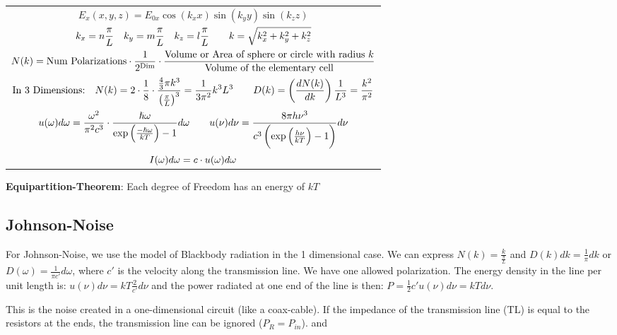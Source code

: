\documentclass[a4paper, 9pt]{extarticle}
\begin{document}
\begin{twocolumn}
\begin{tabular}{c}
	$E_x(x,y,z) = E_{0x} \cos(k_x x) \sin(k_y y) \sin(k_z z)$ \\
	$\displaystyle k_x = n \frac{\pi}{L} \quad \displaystyle k_y = m \frac{\pi}{L} \quad \displaystyle k_z = l \frac{\pi}{L} \qquad k = \sqrt{k_x^2 + k_y^2 + k_z^2}$ \\
	$\displaystyle N(k) = \text{Num Polarizations} \cdot \frac{1}{2^{\text{Dim}}} \cdot \frac{\text{Volume or Area of sphere or circle with radius }k}{\text{Volume of the elementary cell}}$\\
	$\text{In 3 Dimensions:} \quad \displaystyle N(k) = 2 \cdot \frac{1}{8} \cdot \frac{\frac{4}{3} \pi k^3}{\left(\frac{\pi}{L}\right)^3} = \frac{1}{3\pi^2} k^3 L^3 \qquad D(k) = \left(\frac{dN(k)}{dk}\right) \frac{1}{L^3} =  \frac{k^2}{\pi^2}$ \\
	$\displaystyle u(\omega) d\omega =\frac{\omega^2}{\pi^2 c^3} \cdot \frac{\hslash \omega}{\exp\left(\frac{-\hslash \omega}{k T}\right)-1} d\omega \qquad u(\nu) d\nu = \frac{8\pi h \nu^3}{c^3 \left( \exp \left(\frac{h \nu}{k T}\right) - 1\right)} d\nu$ \\
	$\displaystyle I(\omega) d\omega = c \cdot u(\omega) d\omega$
\end{tabular}

\textbf{Equipartition-Theorem}: Each degree of Freedom has an energy of $kT$

\subsection{Johnson-Noise}

For Johnson-Noise, we use the model of Blackbody radiation in the 1 dimensional case. We can express $N(k)= \frac{k}{\frac{\pi}{L}}$ and $D(k) dk = \frac{1}{\pi} dk$ or $D(\omega) = \frac{1}{\pi c'} d\omega$, where $c'$ is the velocity along the transmission line. We have one allowed polarization. The energy density in the line per unit length is: $u(\nu) d\nu = kT \frac{2}{c'} d\nu$ and the power radiated at one end of the line is then: $P = \frac{1}{2} c' u(\nu) d\nu = kT d\nu$.

This is the noise created in a one-dimensional circuit (like a coax-cable). If the impedance of the transmission line (TL) is equal to the resistors at the ends, the transmission line can be ignored ($P_R = P_{in}$).  and 

\begin{tabular}{cc}
	

\end{tabular}
\end{twocolumn}
\end{document}
